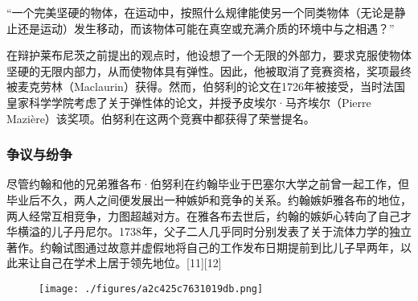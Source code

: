 “一个完美坚硬的物体，在运动中，按照什么规律能使另一个同类物体（无论是静止还是运动）发生移动，而该物体可能在真空或充满介质的环境中与之相遇？”

在辩护莱布尼茨之前提出的观点时，他设想了一个无限的外部力，要求克服使物体坚硬的无限内部力，从而使物体具有弹性。因此，他被取消了竞赛资格，奖项最终被麦克劳林（Maclaurin）获得。然而，伯努利的论文在1726年被接受，当时法国皇家科学学院考虑了关于弹性体的论文，并授予皮埃尔·马齐埃尔（Pierre Mazière）该奖项。伯努利在这两个竞赛中都获得了荣誉提名。
\subsubsection{争议与纷争}
尽管约翰和他的兄弟雅各布·伯努利在约翰毕业于巴塞尔大学之前曾一起工作，但毕业后不久，两人之间便发展出一种嫉妒和竞争的关系。约翰嫉妒雅各布的地位，两人经常互相竞争，力图超越对方。在雅各布去世后，约翰的嫉妒心转向了自己才华横溢的儿子丹尼尔。1738年，父子二人几乎同时分别发表了关于流体力学的独立著作。约翰试图通过故意并虚假地将自己的工作发布日期提前到比儿子早两年，以此来让自己在学术上居于领先地位。[11][12]
\begin{figure}[ht] 
\centering
\texttt{[image: ./figures/a2c425c7631019db.png]}
\caption{} \label{fig_YHBNL_2}
\end{figure}
